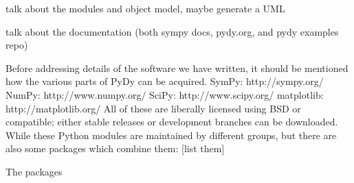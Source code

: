 \documentclass[twocolumn,10pt]{asme2e}
\begin{document}
talk about the modules and object model, maybe generate a UML

talk about the documentation (both sympy docs, pydy.org, and pydy examples repo)

Before addressing details of the software we have written, it should be
mentioned how the various parts of PyDy can be acquired.
SymPy: http://sympy.org/
NumPy: http://www.numpy.org/
SciPy: http://www.scipy.org/
matplotlib: http://matplotlib.org/
All of these are liberally licensed using BSD or compatible; either stable
releases or development branches can be downloaded.
While these Python modules are maintained by different groups, but there are
also some packages which combine them:
[list them]

The packages
\end{document}
